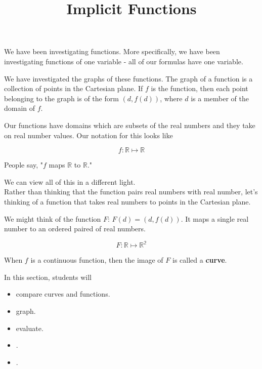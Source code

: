 \documentclass{ximera}
\title{Implicit Functions}
\begin{document}
\begin{abstract}
\end{abstract}
\maketitle








We have been investigating functions.  More specifically, we have been investigating functions of one variable - all of our formulas have one variable.

We have investigated the graphs of these functions.  The graph of a function is a collection of points in the Cartesian plane.  If $f$ is the function, then each point belonging to the graph is of the form $(d, f(d))$, where $d$ is a member of the domain of $f$.

Our functions have domains which are subsets of the real numbers and they take on real number values.  Our notation for this looks like 

\[  f : \mathbb{R} \mapsto \mathbb{R}      \]



\begin{center}
People say, "$f$ maps $\mathbb{R}$ to $\mathbb{R}$."
\end{center}




We can view all of this in a different light. \\




Rather than thinking that the function pairs real numbers with real number, let's thinking of a function that takes real numbers to points in the Cartesian plane.


We might think of the function $F$: $F(d) = (d, f(d))$.  It maps a single real number to an ordered paired of real numbers.



\[  F : \mathbb{R} \mapsto \mathbb{R^2}      \]



When $f$ is a continuous function, then the image of $F$ is called a \textbf{curve}.










\begin{sectionOutcomes}
In this section, students will 

\begin{itemize}
\item compare curves and functions.
\item graph.
\item evaluate.
\item .
\item .
\end{itemize}
\end{sectionOutcomes}
\end{document}
